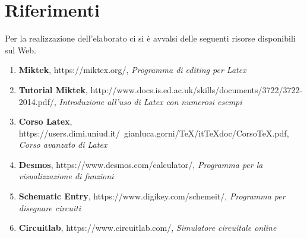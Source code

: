 \documentclass[a4paper,12pt]{article}
\begin{document}
\section{Riferimenti}
Per la realizzazione dell'elaborato ci si è avvalsi delle seguenti risorse disponibili sul Web.

\begin{enumerate}
\item \textbf{Miktek}, https://miktex.org/, \textit{Programma di editing per Latex}
\item \textbf{Tutorial Miktek}, http://www.docs.is.ed.ac.uk/skills/documents/3722/3722-2014.pdf/, \textit{Introduzione all'uso di Latex con numerosi esempi}
\item \textbf{Corso  Latex}, https://users.dimi.uniud.it/~gianluca.gorni/TeX/itTeXdoc/CorsoTeX.pdf, \textit{Corso avanzato di Latex}
\item \textbf{Desmos}, https://www.desmos.com/calculator/, \textit{Programma per la visualizzazione di funzioni}
\item \textbf{Schematic Entry}, https://www.digikey.com/schemeit/, \textit{Programma per disegnare circuiti}
\item \textbf{Circuitlab}, https://www.circuitlab.com/, \textit{Simulatore circuitale online}

\end{enumerate}
\end{document}
